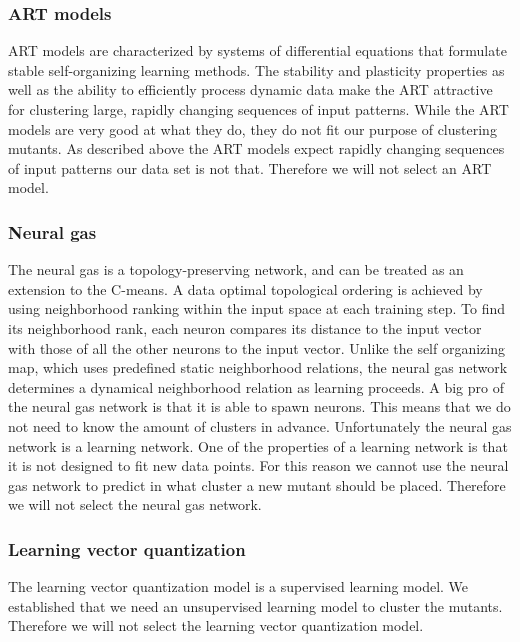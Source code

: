 \documentclass[../../main]{subfiles}
\begin{document}
\subsubsection{ART models}
ART models are characterized by systems of differential equations that formulate stable self-organizing learning methods\cite{Du2010Clustering:Approach}.
The stability and plasticity properties as well as the ability to efficiently process dynamic data make the ART attractive for clustering large, rapidly changing sequences of input patterns\cite{Du2010Clustering:Approach}.
While the ART models are very good at what they do, they do not fit our purpose of clustering mutants.
As described above the ART models expect rapidly changing sequences of input patterns our data set is not that.
Therefore we will not select an ART model.

\subsubsection{Neural gas}
The neural gas is a topology-preserving network, and can be treated as an extension to the C-means\cite{Du2010Clustering:Approach}.
A data optimal topological ordering is achieved by using neighborhood ranking within the input space at each training step\cite{Du2010Clustering:Approach}.
To find its neighborhood rank, each neuron compares its distance to the input vector with those of all the other neurons to the input vector\cite{Du2010Clustering:Approach}. 
Unlike the self organizing map, which uses predefined static neighborhood relations, the neural gas network determines a dynamical neighborhood relation as learning proceeds\cite{Du2010Clustering:Approach}.
A big pro of the neural gas network is that it is able to spawn neurons.
This means that we do not need to know the amount of clusters in advance.
Unfortunately the neural gas network is a learning network.
One of the properties of a learning network is that it is not designed to fit new data points\cite{supervisedUnsupervised}.
For this reason we cannot use the neural gas network to predict in what cluster a new mutant should be placed.
Therefore we will not select the neural gas network.

\subsubsection{Learning vector quantization}
The learning vector quantization model is a supervised learning model.
We established that we need an unsupervised learning model to cluster the mutants.
Therefore we will not select the learning vector quantization model.
\end{document}

